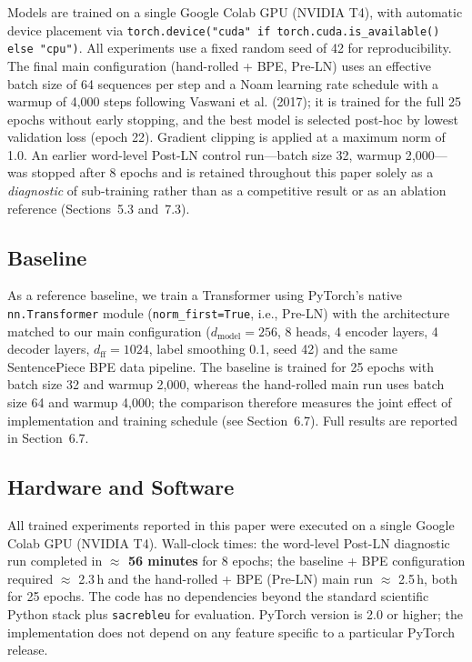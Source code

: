 \documentclass[10pt]{article}
\begin{document}
Models are trained on a single Google Colab GPU (NVIDIA T4), with automatic device placement via \texttt{torch.device("cuda" if torch.cuda.is\_available() else "cpu")}. All experiments use a fixed random seed of 42 for reproducibility. The final main configuration (hand-rolled + BPE, Pre-LN) uses an effective batch size of 64 sequences per step and a Noam learning rate schedule with a warmup of 4{,}000 steps following Vaswani et al. (2017); it is trained for the full 25 epochs without early stopping, and the best model is selected post-hoc by lowest validation loss (epoch 22). Gradient clipping is applied at a maximum norm of 1.0. An earlier word-level Post-LN control run---batch size 32, warmup 2{,}000---was stopped after 8 epochs and is retained throughout this paper solely as a \textit{diagnostic} of sub-training rather than as a competitive result or as an ablation reference (Sections~5.3 and~7.3).

\subsection{Baseline}

As a reference baseline, we train a Transformer using PyTorch's native \texttt{nn.Transformer} module (\texttt{norm\_first=True}, i.e., Pre-LN) with the architecture matched to our main configuration ($d_{\text{model}}=256$, 8 heads, 4 encoder layers, 4 decoder layers, $d_{\text{ff}}=1024$, label smoothing 0.1, seed 42) and the same SentencePiece BPE data pipeline. The baseline is trained for 25 epochs with batch size 32 and warmup 2{,}000, whereas the hand-rolled main run uses batch size 64 and warmup 4{,}000; the comparison therefore measures the joint effect of implementation and training schedule (see Section~6.7). Full results are reported in Section~6.7.

\subsection{Hardware and Software}

All trained experiments reported in this paper were executed on a single Google Colab GPU (NVIDIA T4). Wall-clock times: the word-level Post-LN diagnostic run completed in \textbf{$\approx$ 56 minutes} for 8 epochs; the baseline + BPE configuration required $\approx$ 2.3\,h and the hand-rolled + BPE (Pre-LN) main run $\approx$ 2.5\,h, both for 25 epochs. The code has no dependencies beyond the standard scientific Python stack plus \texttt{sacrebleu} for evaluation. PyTorch version is 2.0 or higher; the implementation does not depend on any feature specific to a particular PyTorch release.
\end{document}
